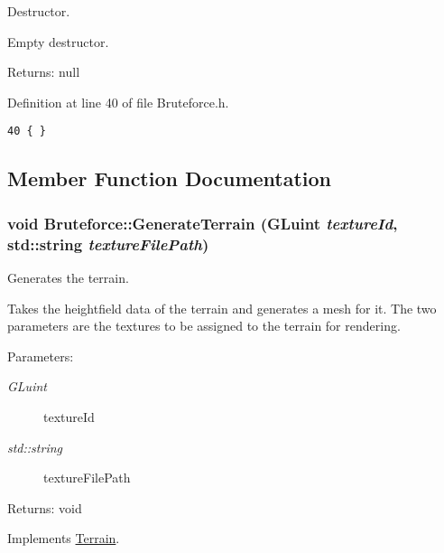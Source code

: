 Destructor. 

Empty destructor.

\begin{Desc}
\item[Returns:]null \end{Desc}


Definition at line 40 of file Bruteforce.h.

\begin{Code}\begin{verbatim}40 { }
\end{verbatim}
\end{Code}




\subsection{Member Function Documentation}
\hypertarget{class_bruteforce_910463356742edd6703a19b46f4ed359}{
\subsubsection[GenerateTerrain]{\setlength{\rightskip}{0pt plus 5cm}void Bruteforce::GenerateTerrain (GLuint {\em textureId}, \/  std::string {\em textureFilePath})}}
\label{class_bruteforce_910463356742edd6703a19b46f4ed359}


Generates the terrain. 

Takes the heightfield data of the terrain and generates a mesh for it. The two parameters are the textures to be assigned to the terrain for rendering.

\begin{Desc}
\item[Parameters:]
\begin{description}
\item[{\em GLuint}]textureId \item[{\em std::string}]textureFilePath \end{description}
\end{Desc}
\begin{Desc}
\item[Returns:]void \end{Desc}


Implements \hyperlink{class_terrain_93fa5e9433a77d8f8bbe2a2f6aadf2ab}{Terrain}.

